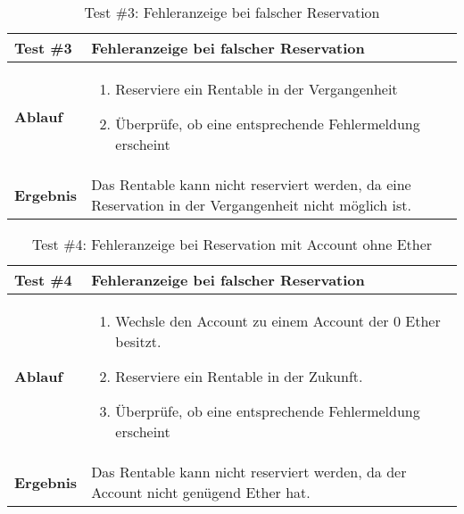 \begin{table}[H]
\centering
\caption{Test \#3: Fehleranzeige bei falscher Reservation}
\label{my-label}
\begin{tabular}{@{}L{1.6cm}L{11cm}@{}}
\toprule
\textbf{Test \#3}
& Fehleranzeige bei falscher Reservation
\\ \midrule
\textbf{Ablauf}
& 
\begin{enumerate}
    \item Reserviere ein Rentable in der Vergangenheit
    \item Überprüfe, ob eine entsprechende Fehlermeldung erscheint
\end{enumerate}
\\ \midrule
\textbf{Ergebnis}
& Das Rentable kann nicht reserviert werden, da eine Reservation in der Vergangenheit nicht möglich ist. 
\\ \bottomrule
\end{tabular}
\end{table}

\begin{table}[H]
\centering
\caption{Test \#4: Fehleranzeige bei Reservation mit Account ohne Ether}
\label{my-label}
\begin{tabular}{@{}L{1.6cm}L{11cm}@{}}
\toprule
\textbf{Test \#4}
& Fehleranzeige bei falscher Reservation
\\ \midrule
\textbf{Ablauf}
& 
\begin{enumerate}
    \item Wechsle den Account zu einem Account der 0 Ether besitzt.
    \item Reserviere ein Rentable in der Zukunft.
    \item Überprüfe, ob eine entsprechende Fehlermeldung erscheint
\end{enumerate}
\\ \midrule
\textbf{Ergebnis}
& Das Rentable kann nicht reserviert werden, da der Account nicht genügend Ether hat.
\\ \bottomrule
\end{tabular}
\end{table}